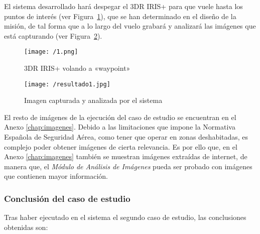 El sistema desarrollado hará despegar el 3DR IRIS+ para que vuele hasta los puntos de interés (ver Figura~\ref{fig:1}), que se han determinado en el diseño de la misión, de tal forma que a lo largo del vuelo grabará y analizará las imágenes que está capturando (ver Figura~\ref{fig:imagen1}). \\

\begin{figure}[!h]
\begin{center}
\texttt{[image: /1.png]}
\caption[3DR IRIS+ volando a «waypoint»]{3DR IRIS+ volando a «waypoint» \footnotemark} 
\label{fig:1}
\end{center}
\end{figure}


\begin{figure}[!h]
\begin{center}
\texttt{[image: /resultado1.jpg]}
\caption[Imagen capturada y analizada por el sistema]{Imagen capturada y analizada por el sistema}
\label{fig:imagen1}
\end{center}
\end{figure}

El resto de imágenes de la ejecución del caso de estudio se encuentran en el Anexo \ref{chap:imagenes}. Debido a las limitaciones que impone la Normativa Española de Seguridad Aérea, como tener que operar en zonas deshabitadas, es complejo poder obtener imágenes de cierta relevancia. Es por ello que, en el Anexo \ref{chap:imagenes} también se muestran imágenes extraídas de internet, de manera que, el \textit{Módulo de Análisis de Imágenes} pueda ser probado con imágenes que contienen mayor información.


\subsubsection{Conclusión del caso de estudio}

Tras haber ejecutado en el sistema el segundo caso de estudio, las conclusiones obtenidas son:


